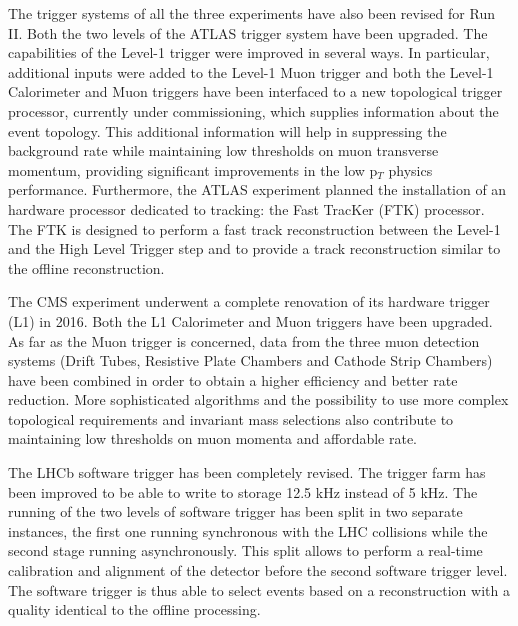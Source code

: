The trigger systems of all the three experiments have also been revised for Run II.
Both the two levels of the ATLAS trigger system have been upgraded.
The capabilities of the Level-1 trigger were improved in several ways.
In particular, additional inputs were added to the Level-1 Muon trigger and both the Level-1 Calorimeter and Muon triggers have been interfaced to a new topological trigger processor, currently under commissioning, which supplies information about the event topology. 
This additional information will help in suppressing the background rate while maintaining low thresholds on muon transverse momentum, providing significant improvements in the low p$_T$ physics performance.
Furthermore, the ATLAS experiment planned the installation of an hardware processor dedicated to tracking: the Fast TracKer (FTK) processor. 
The FTK is designed to perform a fast track reconstruction between the Level-1 and the High Level Trigger step and to provide a track reconstruction similar to the offline reconstruction.

The CMS experiment underwent a complete renovation of its hardware trigger (L1) in 2016.
Both the L1 Calorimeter and Muon triggers have been upgraded.
As far as the Muon trigger is concerned, data from the three muon detection systems (Drift Tubes, Resistive Plate Chambers and Cathode Strip Chambers) have been combined in order to obtain a higher efficiency and better rate reduction. 
More sophisticated algorithms and the possibility to use more complex topological requirements and invariant mass selections also contribute to maintaining low thresholds on muon momenta and affordable rate.

The LHCb software trigger has been completely revised. 
The trigger farm has been improved to be able to write to storage 12.5 kHz instead of 5 kHz.
The running of the two levels of software trigger has been split in two separate instances, 
the first one running synchronous with the LHC collisions while the second stage running asynchronously. 
This split allows to perform a real-time calibration and alignment of the detector before the second software trigger level.
The software trigger is thus able to select events based on a reconstruction with a quality identical to the offline processing.



